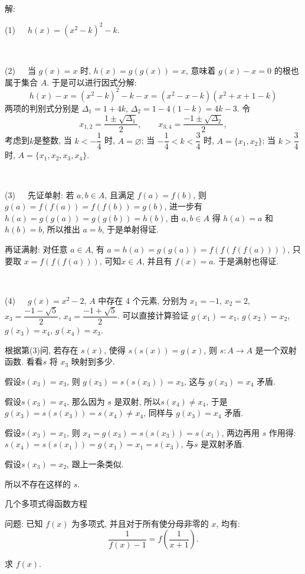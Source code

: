 ~

\noindent 解: 

(1)\ \ \ $h(x) = (x^2-k)^2-k$.

~

(2)\ \ \ 当 $g(x)=x$ 时, $h(x)=g(g(x))=x$, 意味着 $g(x)-x=0$ 的根也属于集合 $A$. 于是可以进行因式分解:
\[ h(x)-x =  (x^2-k)^2-k - x = (x^2-x-k)(x^2+x+1-k) \]
两项的判别式分别是 $\Delta_1 = 1+4k$, $\Delta_2 = 1-4(1-k)=4k-3$. 令
\[x_{1,2}=\frac{1\pm\sqrt{\Delta_1}}{2},\qquad x_{3,4}=\frac{-1\pm\sqrt{\Delta_2}}{2} ,\]
考虑到$k$是整数,
当 $k < -\dfrac{1}{4}$ 时, $A=\varnothing$;
当 $-\dfrac{1}{4} < k < \dfrac{3}{4}$ 时, $A=\{x_1, x_2\}$;
当 $k > \dfrac{3}{4}$ 时, $A=\{x_1, x_2, x_3, x_4\}$.

~

(3)\ \ \ 先证单射: 若 $a,b\in A$, 且满足 $f(a)=f(b)$, 则 $g(a)=f(f(a))=f(f(b))=g(b)$, 进一步有 $h(a)=g(g(a))=g(g(b))=h(b)$, 由 $a,b\in A$ 得 $h(a)=a$ 和 $h(b)=b$, 所以推出 $a=b$, 于是单射得证.

再证满射: 对任意 $a\in A$, 有 $a = h(a)=g(g(a))=f(f(f(f(a))))$, 只要取 $x = f(f(f(a)))$, 可知$x\in A$, 并且有 $f(x)=a$. 于是满射也得证.

~

(4)\ \ \ $g(x)=x^2-2$, $A$ 中存在 4 个元素, 分别为 $x_1 = -1$, $x_2=2$, $x_3=\dfrac{-1-\sqrt{5}}{2}$, $x_4=\dfrac{-1+\sqrt{5}}{2}$. 可以直接计算验证 $g(x_1)=x_1$, $g(x_2)=x_2$, $g(x_3)=x_4$, $g(x_4)=x_3$. 

根据第(3)问, 若存在 $s(x)$, 使得 $s(s(x))=g(x)$, 则 $s: A\rightarrow A$ 是一个双射函数. 看看$s$ 将 $x_3$ 映射到多少. 

假设$s(x_3)=x_3$, 则 $g(x_3)=s(s(x_3))=x_3$, 这与 $g(x_3)=x_4$ 矛盾.

假设$s(x_3)=x_4$, 那么因为 $s$ 是双射, 所以$s(x_4)\ne x_4$, 于是 $g(x_3)=s(s(x_3))=s(x_4)\ne x_4$, 同样与 $g(x_3)=x_4$ 矛盾.

假设$s(x_3)=x_1$, 则 $x_4 = g(x_3)=s(s(x_3))=s(x_1)$, 两边再用 $s$ 作用得: $s(x_4) = s(s(x_1)) = g(x_1)=x_1=s(x_3)$, 与$s$ 是双射矛盾. 

假设$s(x_3)=x_2$, 跟上一条类似.

所以不存在这样的 $s$.


\newpage
\noindent 几个多项式得函数方程

问题: 已知 $f(x)$ 为多项式, 并且对于所有使分母非零的 $x$, 均有:
\[ \frac{1}{f(x)-1} = f(\frac{1}{x+1}). \]

求 $f(x)$.

